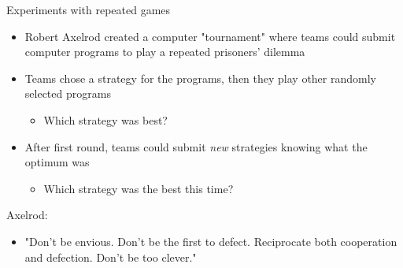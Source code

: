\documentclass[10pt]{beamer}
\begin{document}
\begin{frame}[label={sec:orgdab8e35}]{}
\alert{Experiments with repeated games}
\begin{itemize}
\item Robert Axelrod created a computer "tournament" where teams could submit computer programs to play a repeated prisoners' dilemma
\item Teams chose a strategy for the programs, then they play other randomly selected programs
\begin{itemize}
\item Which strategy was best?
\end{itemize}
\item After first round, teams could submit \emph{new} strategies knowing what the optimum was
\begin{itemize}
\item Which strategy was the best this time?
\end{itemize}
\end{itemize}
\end{frame}

\begin{frame}[label={sec:orgccd13e5}]{}
\alert{Axelrod}:
\begin{itemize}
\item "Don't be envious. Don't be the first to defect. Reciprocate both cooperation and defection. Don't be too clever."
\end{itemize}
\end{frame}
\end{document}
